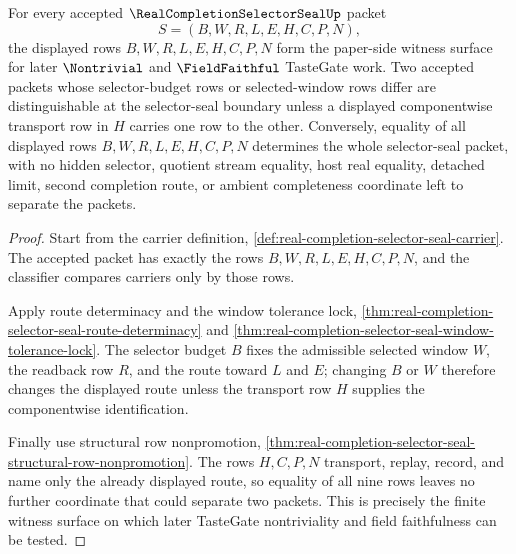 \begin{theorem}
\label{thm:real-completion-selector-seal-tastegate-witness-surface}
For every accepted $\RealCompletionSelectorSealUp$ packet
$$
S=(B,W,R,L,E,H,C,P,N),
$$
the displayed rows $B,W,R,L,E,H,C,P,N$ form the paper-side witness surface for later $\Nontrivial$ and $\FieldFaithful$ TasteGate work. Two accepted packets whose selector-budget rows or selected-window rows differ are distinguishable at the selector-seal boundary unless a displayed componentwise transport row in $H$ carries one row to the other. Conversely, equality of all displayed rows $B,W,R,L,E,H,C,P,N$ determines the whole selector-seal packet, with no hidden selector, quotient stream equality, host real equality, detached limit, second completion route, or ambient completeness coordinate left to separate the packets.
\end{theorem}
\begin{proof}
Start from the carrier definition, \autoref{def:real-completion-selector-seal-carrier}. The accepted packet has exactly the rows $B,W,R,L,E,H,C,P,N$, and the classifier compares carriers only by those rows.

Apply route determinacy and the window tolerance lock, \autoref{thm:real-completion-selector-seal-route-determinacy} and \autoref{thm:real-completion-selector-seal-window-tolerance-lock}. The selector budget $B$ fixes the admissible selected window $W$, the readback row $R$, and the route toward $L$ and $E$; changing $B$ or $W$ therefore changes the displayed route unless the transport row $H$ supplies the componentwise identification.

Finally use structural row nonpromotion, \autoref{thm:real-completion-selector-seal-structural-row-nonpromotion}. The rows $H,C,P,N$ transport, replay, record, and name only the already displayed route, so equality of all nine rows leaves no further coordinate that could separate two packets. This is precisely the finite witness surface on which later TasteGate nontriviality and field faithfulness can be tested.
\end{proof}

